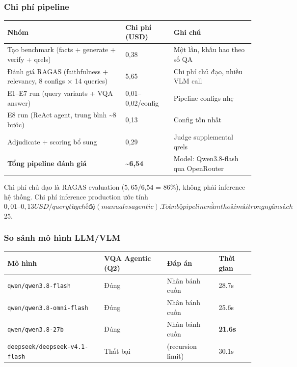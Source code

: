 \documentclass[12pt,a4paper,onecolumn]{article}
\begin{document}
\subsubsection{Chi phí pipeline}

\noindent
\begin{tabularx}{\textwidth}{Y l Y}
\toprule
Nhóm & Chi phí (USD) & Ghi chú \\
\midrule
Tạo benchmark (facts + generate + verify + qrels) & 0,38 & Một lần, khấu hao theo số QA \\
Đánh giá RAGAS (faithfulness + relevancy, 8 configs × 14 queries) & 5,65 & Chi phí chủ đạo, nhiều VLM call \\
E1–E7 run (query variants + VQA answer) & 0,01–0,02/config & Pipeline configs nhẹ \\
E8 run (ReAct agent, trung bình \textasciitilde{}8 bước) & 0,13 & Config tốn nhất \\
Adjudicate + scoring bổ sung & 0,29 & Judge supplemental qrels \\
\textbf{Tổng pipeline đánh giá} & \textbf{\textasciitilde{}6,54} & Model: Qwen3.8-flash qua OpenRouter \\
\bottomrule
\end{tabularx}


Chi phí chủ đạo là RAGAS evaluation ($5,65 / $6,54 = 86\%), không phải inference hệ thống. Chi phí inference production ước tính $0,01–0,13 USD/query tùy chế độ (manual vs agentic). Toàn bộ pipeline nằm thoải mái trong ngân sách $25.

\subsubsection{So sánh mô hình LLM/VLM}

\begin{center}
\begin{tabular}{l l l l}
\toprule
Mô hình & VQA Agentic (Q2) & Đáp án & Thời gian \\
\midrule
\texttt{qwen/qwen3.8-flash} & Đúng & Nhân bánh cuốn & 28.7s \\
\texttt{qwen/qwen3.8-omni-flash} & Đúng & Nhân bánh cuốn & 25.6s \\
\texttt{qwen/qwen3.8-27b} & Đúng & Nhân bánh cuốn & \textbf{21.6s} \\
\texttt{deepseek/deepseek-v4.1-flash} & Thất bại & (recursion limit) & 30.1s \\
\bottomrule
\end{tabular}
\end{center}
\end{document}
